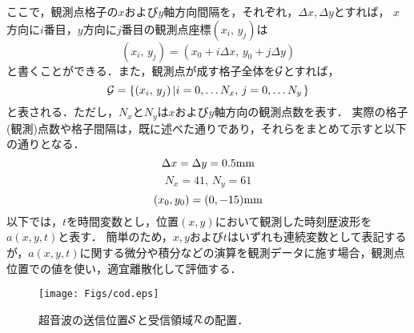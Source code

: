 ここで，観測点格子の$x$および$y$軸方向間隔を，それぞれ，$\Delta x,\Delta y$とすれば，
$x$方向に$i$番目，$y$方向に$j$番目の観測点座標$(x_i,\, y_j)$は
\begin{equation}
	(x_i,\, y_j)=(x_0+i\Delta x,\, y_0+j\Delta y)
	\label{eqn:x_ij}
\end{equation}
と書くことができる．また，観測点が成す格子全体を${\cal G}$とすれば，
\begin{equation}
	{\cal G} = \left\{ 
	(x_i,\, y_j)\left| i=0,\dots N_x, \, j=0,\dots N_y  \right.
	\right\}
	\label{eqn:Grid}
\end{equation}
と表される．ただし，$N_x$と$N_y$は$x$および$y$軸方向の観測点数を表す．
実際の格子(観測)点数や格子間隔は，既に述べた通りであり，それらをまとめて示すと以下の通りとなる．
\begin{equation}
	\Delta x=\Delta y=0.5 {\rm mm}
	\label{eqn:grid_prms}
\end{equation}
\begin{equation}
	N_x=41, \, N_y=61
	\label{eqn:grid_nums}
\end{equation}
\begin{equation}
	(x_0,y_0)=(0,-15){\rm mm}
	\label{eqn:grid_corner}
\end{equation}
以下では，$t$を時間変数とし，位置$(x,y)$において観測した時刻歴波形を$a(x,y,t)$と表す．
簡単のため，$x,y$および$t$はいずれも連続変数として表記するが，$a(x,y,t)$に関する微分や積分などの演算を観測データに施す場合，観測点位置での値を使い，適宜離散化して評価する．
\begin{figure}[t]
\begin{center}
\texttt{[image: Figs/cod.eps]}
\caption{
	超音波の送信位置$\cal S$と受信領域$\cal R$の配置．
}
\label{fig:fig4}
\end{center}
	\vspace{-10mm}
\end{figure}
